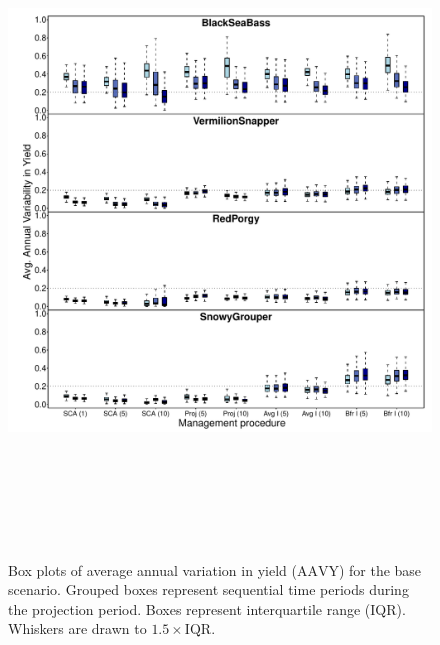 \documentclass[12pt,english]{article}
\begin{document}
\clearpage\begin{figure}[!ht]
\begin{center}
\includegraphics[width=6in, height=7in]{../Figs/boxplotAAVY1.pdf}
\end{center}
\begin{flushleft}
\caption{Box plots of average annual variation in yield ($\mathrm{AAVY}$) for the base scenario. Grouped boxes represent sequential time periods during the projection period. Boxes represent interquartile range (IQR). Whiskers are drawn to $1.5\times\mathrm{IQR}$.}
\label{fig:boxplotAAVY1}
\end{flushleft}
\end{figure}
\clearpage
\end{document}
